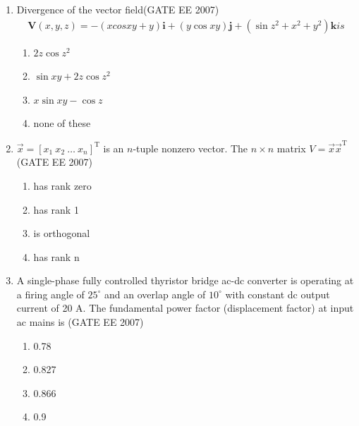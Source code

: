 \documentclass[a4paper,10pt]{exam}
\theoremstyle{remark}
\begin{document}
\begin{enumerate}
\item  Divergence of the vector field\hfill{(GATE EE 2007)} 
\begin{align}
\textbf{V}(x,y,z)=-(x cos xy+y)\textbf{i}+ 
(y \cos xy)\textbf{j}+(\sin z^2+x^2+y^2)\textbf{k} is        
\end{align}


\begin{multicols}{2}
\begin{enumerate}
\item $ 2z \cos z^{2}$
\item $\sin xy + 2z \cos z^{2}$
\item $ x \sin xy - \cos z$
\item none of these
\end{enumerate}
\end{multicols}
\vspace{0.5cm}

\noindent
\item  \quad $\vec{x} = [x_1\ x_2\ \ldots\ x_n]^{\mathrm{T}}$ is an $n$-tuple nonzero vector. The $n \times n$ matrix $V = \vec{x} \vec{x}^{\mathrm{T}}$ \hfill{(GATE EE 2007)} 

\begin{multicols}{2}
\begin{enumerate}
\item has rank zero
\item has rank 1
\item is orthogonal
\item has rank n
\end{enumerate}
\end{multicols}

\noindent
\item  \quad A single-phase fully controlled thyristor bridge ac-dc converter is operating at a firing angle of $25^\circ$ and an overlap angle of $10^\circ$ with constant dc output current of 20 A. The fundamental power factor (displacement factor) at input ac mains is \hfill{(GATE EE 2007)} 

\begin{multicols}{2}
\begin{enumerate}
 \item    0.78
\item  0.827
\item 0.866
\item  0.9
\end{enumerate}
\end{multicols}

\newpage


\end{enumerate}
\end{document}
